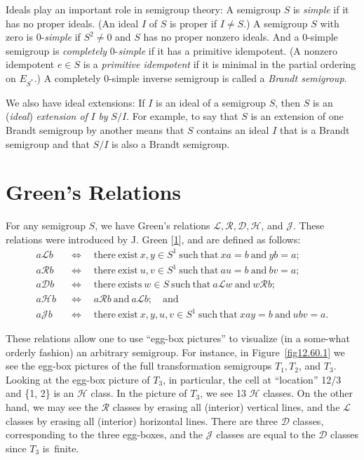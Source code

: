 \documentclass{surv-l}
\numberwithin{equation}{section}
\numberwithin{table}{section}
\numberwithin{figure}{section}
\theoremstyle{definition}
\begin{document}
Ideals play an important role in semigroup theory: A semigroup $S$
is \emph{simple} if it has no proper ideals. (An ideal $I$ of $S$
is proper if $I \neq S$.) A semigroup $S$ with zero is
$0$-\emph{simple} if $S^{2}\neq 0$ and $S$ has no proper nonzero
ideals. And a $0$-simple semigroup is
\emph{completely} $0$-\emph{simple}
if it has a primitive idempotent. (A nonzero idempotent $e\in S$
is a \emph{primitive idempotent} if it is minimal in the partial
ordering on $E_{S^{\ast}}.$) A completely $0$-simple
inverse semigroup is called a \emph{Brandt
semigroup}.

We also have ideal extensions: If $I$ is
an ideal of a semigroup $S$, then $S$ is an (\emph{ideal})
\emph{extension of} $I$ \emph{by} $S/I$. For example, to say that
$S$ is an extension of one Brandt semigroup by another means that
$S$ contains an ideal $I$ that is a Brandt semigroup and that
$S/I$ is also a Brandt semigroup.

\section{Green's Relations}\label{secA.77}

For any semigroup $S$, we have Green's relations $\mathcal{L},
\mathcal{R}, \mathcal{D}, \mathcal{H}$, and $\mathcal{J}$. These
relations were introduced by J. Green
[\hyperlink{bib24}{1}], and are defined as follows:
\begin{align*}
a\mathcal{L}b &\enspace \Leftrightarrow\quad \mathrm{there\ exist}\ x, y\in S^{1}\ \mathrm{such\
that}\ xa=b\ \mathrm{and}\ yb=a; \\
a\mathcal{R}b &\enspace \Leftrightarrow\quad \mathrm{there\ exist}\ u, v\in S^{1}\ \mathrm{such\
that}\ au=b\ \mathrm{and}\ bv =a; \\
a\mathcal{D}b &\enspace\Leftrightarrow\quad \mathrm{there\ exists}\ w\in S\ \mathrm{such\ that}\
a\mathcal{L}w\ \mathrm{and}\ w\mathcal{R}b; \\
a\mathcal{H}b&\enspace\Leftrightarrow\quad a\mathcal{R}b\ \mathrm{and}\ a\mathcal{L}b;\quad \mathrm{and} \\
a\mathcal{J}b &\enspace\Leftrightarrow\quad \mathrm{there\ exist}\ x, y, u, v\in S^{1}\ \mathrm{such\ that}\ xay=b\ \mathrm{and}\ ubv=a.
\end{align*}

These relations allow one to use ``egg-box pictures'' to visualize
(in a some-what orderly fashion) an arbitrary semigroup. For
instance, in Figure~\ref{fig12.60.1} we see the egg-box pictures
of the full transformation semigroups $T_{1}, T_{2}$, and $T_{3}$.
Looking at the egg-box picture of $T_{3}$, in particular, the cell
at ``location'' 12/3 and \{1, 2\} is an $\mathcal{H}$ class. In
the picture of $T_{3}$, we see 13 $\mathcal{H}$ classes. On the
other hand, we may see the $\mathcal{R}$ classes by erasing all
(interior) vertical lines, and the $\mathcal{L}$ classes by
erasing all (interior) horizontal lines. There are three
$\mathcal{D}$ classes, corresponding to the three egg-boxes, and
the $\mathcal{J}$ classes are equal to the $\mathcal{D}$ classes
since $T_{3}$ is~finite.
\end{document}
